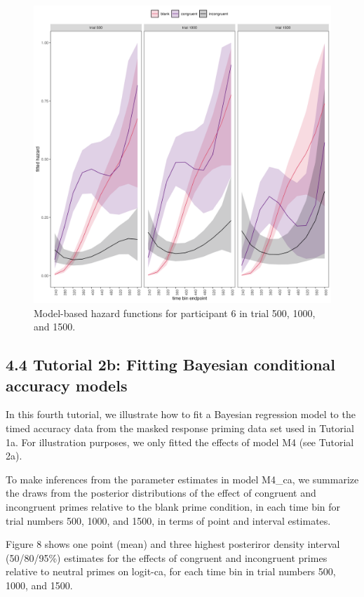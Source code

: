 \documentclass[
  man,floatsintext]{apa6}
\begin{document}
\begin{figure}[H]

{\centering \includegraphics[width=0.8\linewidth,height=0.67\textheight,]{../Tutorial_2_Bayesian/figures/M4effects_subject6} 

}

\caption{Model-based hazard functions for participant 6 in trial 500, 1000, and 1500.}\label{fig:plot-hazard-subject6}
\end{figure}

\subsection{4.4 Tutorial 2b: Fitting Bayesian conditional accuracy models}\label{tutorial-2b-fitting-bayesian-conditional-accuracy-models}

In this fourth tutorial, we illustrate how to fit a Bayesian regression model to the timed accuracy data from the masked response priming data set used in Tutorial 1a. For illustration purposes, we only fitted the effects of model M4 (see Tutorial 2a).

To make inferences from the parameter estimates in model M4\_ca, we summarize the draws from the posterior distributions of the effect of congruent and incongruent primes relative to the blank prime condition, in each time bin for trial numbers 500, 1000, and 1500, in terms of point and interval estimates.

Figure 8 shows one point (mean) and three highest posteriror density interval (50/80/95\%) estimates for the effects of congruent and incongruent primes relative to neutral primes on logit-ca, for each time bin in trial numbers 500, 1000, and 1500.
\end{document}
